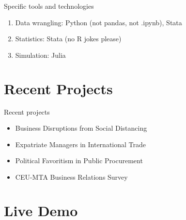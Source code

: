 \documentclass[
  ignorenonframetext,
  aspectratio=54,
]{beamer}
\providecommand{\tightlist}{%
  \setlength{\itemsep}{0pt}\setlength{\parskip}{0pt}}
\begin{document}
\begin{frame}{Specific tools and technologies}
\protect\hypertarget{specific-tools-and-technologies}{}
\begin{enumerate}
\tightlist
\item
  Data wrangling: Python (not pandas, not .ipynb), Stata
\item
  Statistics: Stata (no R jokes please)
\item
  Simulation: Julia
\end{enumerate}
\end{frame}

\hypertarget{recent-projects}{%
\section{Recent Projects}\label{recent-projects}}

\begin{frame}{Recent projects}
\protect\hypertarget{recent-projects-1}{}
\begin{itemize}
\tightlist
\item
  Business Disruptions from Social Distancing
\item
  Expatriate Managers in International Trade
\item
  Political Favoritism in Public Procurement
\item
  CEU-MTA Business Relations Survey
\end{itemize}
\end{frame}

\hypertarget{live-demo}{%
\section{Live Demo}\label{live-demo}}
\end{document}
